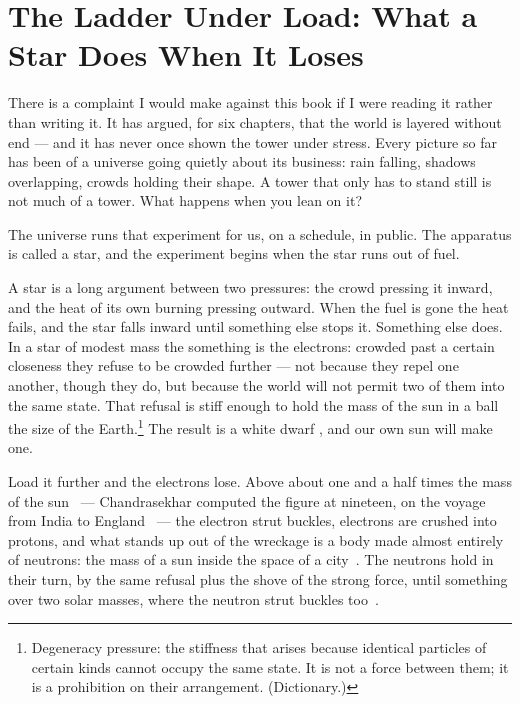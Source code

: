 \documentclass[fontsize=11pt,paper=a4,pagesize=auto,parskip=half-]{scrbook}
\newcommand{\Ixtmp}{}
\DeclareRobustCommand{\Ix}[1]{%
  #1%
  \begingroup
    \lowercase{\gdef\Ixtmp{#1}}%
    \expandafter\index\expandafter{\Ixtmp}%
  \endgroup}
\newcommand{\Iy}[1]{#1\index{#1}}
\begin{document}
\section{The Ladder Under Load: What a Star Does When It Loses}

There is a complaint I would make against this book if I were reading it rather than writing it. It has argued, for six chapters, that the world is layered without end --- and it has never once shown the tower under stress. Every picture so far has been of a universe going quietly about its business: rain falling, shadows overlapping, crowds holding their shape. A tower that only has to stand still is not much of a tower. What happens when you lean on it?

The universe runs that experiment for us, on a schedule, in public. The apparatus is called a star, and the experiment begins when the star runs out of fuel.

A star is a long argument between two pressures: the crowd pressing it inward, and the heat of its own burning pressing outward. When the fuel is gone the heat fails, and the star falls inward until something else stops it. Something else does. In a star of modest mass the something is the electrons: crowded past a certain closeness they refuse to be crowded further --- not because they repel one another, though they do, but because the world will not permit two of them into the same state. That refusal is stiff enough to hold the mass of the sun in a ball the size of the Earth.\footnote{Degeneracy pressure: the stiffness that arises because identical particles of certain kinds cannot occupy the same state. It is not a force between them; it is a prohibition on their arrangement. (Dictionary.)} The result is a \Ix{white dwarf}, and our own sun will make one.

Load it further and the electrons lose. Above about one and a half times the mass of the sun~\cite{chandrasekhar1931} --- \Iy{Chandrasekhar} computed the figure at nineteen, on the voyage from India to England~\cite{wali1991} --- the electron strut buckles, electrons are crushed into protons, and what stands up out of the wreckage is a body made almost entirely of neutrons: the mass of a sun inside the space of a city~\cite{baadezwicky1934cr}. The neutrons hold in their turn, by the same refusal plus the shove of the strong force, until something over two solar masses, where the neutron strut buckles too~\cite{oppenheimervolkoff1939,fonseca2021}.
\end{document}
